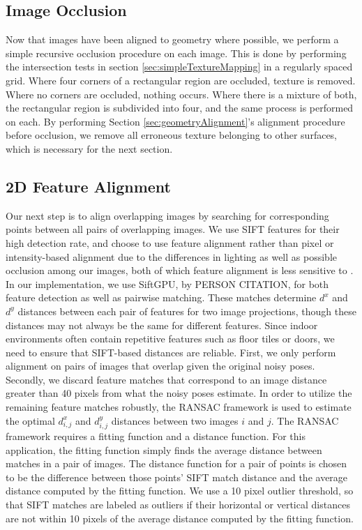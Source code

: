 \documentclass[]{spie}  %
\begin{document}
\subsection{Image Occlusion}
\label{sec:imageOcclusion}
Now that images have been aligned to geometry where possible, we
perform a simple recursive occlusion procedure on each image. This is
done by performing the intersection tests in section
\ref{sec:simpleTextureMapping} in a regularly spaced grid. Where four
corners of a rectangular region are occluded, texture is
removed. Where no corners are occluded, nothing occurs. Where there is
a mixture of both, the rectangular region is subdivided into four, and
the same process is performed on each. By performing Section
\ref{sec:geometryAlignment}'s alignment procedure before occlusion, we
remove all erroneous texture belonging to other surfaces, which is
necessary for the next section.

\subsection{2D Feature Alignment}
\label{sec:robustSIFTFeatureMatching}
Our next step is to align overlapping images by searching for
corresponding points between all pairs of overlapping images. We use
SIFT features for their high detection rate, and choose to use feature
alignment rather than pixel or intensity-based alignment due to the
differences in lighting as well as possible occlusion among our
images, both of which feature alignment is less sensitive to
\cite{lai1999robust, lowe1999object, mikolajczyk2005performance,
  szeliski2006image}.  In our implementation, we use SiftGPU, by
PERSON CITATION, for both feature detection as well as pairwise
matching. These matches determine $d^x$ and $d^y$ distances between
each pair of features for two image projections, though these
distances may not always be the same for different features. Since
indoor environments often contain repetitive features such as floor
tiles or doors, we need to ensure that SIFT-based distances are
reliable. First, we only perform alignment on pairs of images that
overlap given the original noisy poses. Secondly, we discard feature
matches that correspond to an image distance greater than 40 pixels
from what the noisy poses estimate. In order to utilize the remaining
feature matches robustly, the RANSAC framework
\cite{fischler1981random} is used to estimate the optimal $d^x_{i,j}$
and $d^y_{i,j}$ distances between two images $i$ and $j$. The RANSAC
framework requires a fitting function and a distance function. For
this application, the fitting function simply finds the average
distance between matches in a pair of images. The distance function
for a pair of points is chosen to be the difference between those
points' SIFT match distance and the average distance computed by the
fitting function. We use a 10 pixel outlier threshold, so that SIFT
matches are labeled as outliers if their horizontal or vertical
distances are not within 10 pixels of the average distance computed by
the fitting function.
\end{document}
